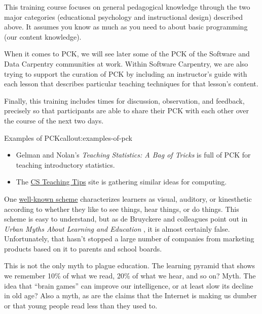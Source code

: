 This training course focuses on general pedagogical knowledge through
the two major categories (educational psychology and instructional
design) described above. It assumes you know as much as you need to
about basic programming (our content knowledge).

When it comes to PCK, we will see later  some
of the PCK of the Software and Data Carpentry communities at
work. Within Software Carpentry, we are also trying to support the
curation of PCK by including an instructor's guide with each lesson
that describes particular teaching techniques for that lesson's
content.

Finally, this training includes times for discussion, observation, and
feedback, precisely so that participants are able to share their PCK
with each other over the course of the next two days.

\begin{callout}{Examples of PCK}{callout:examples-of-pck}

\begin{itemize}
\item
  Gelman and Nolan's
  \textit{Teaching   Statistics: A Bag of Tricks} \cite{bib:gelman-nolan-stats-tricks}
  is full of PCK for teaching introductory statistics.
\item
  The \href{http://csteachingtips.org/}{CS Teaching Tips} site is
  gathering similar ideas for computing.
\end{itemize}
\end{callout}


One
\href{https://en.wikipedia.org/wiki/Learning\_styles\#Learning\_modalities}{well-known
scheme} characterizes learners as visual, auditory, or kinesthetic
according to whether they like to see things, hear things, or do things.
This scheme is easy to understand, but as de Bruyckere and colleagues
point out in
\textit{Urban Myths About Learning and Education} \cite{bib:debruyckere-urban-myths},
it is almost certainly false.
Unfortunately, that hasn't stopped a large number of companies from
marketing products based on it to parents and school boards.

This is not the only myth to plague education. The learning pyramid that
shows we remember 10\% of what we read, 20\% of what we hear, and so on?
Myth.
The idea that ``brain games'' can improve our intelligence, or at least
slow its decline in old age?
Also a myth, as are the claims that the Internet is making us dumber or that
young people read less than they used to.

